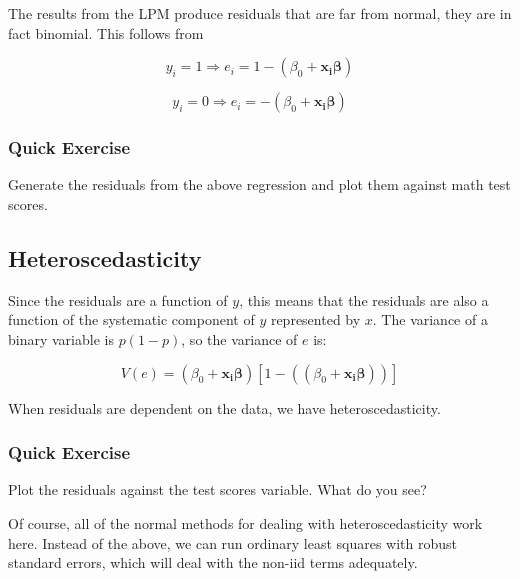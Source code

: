 \documentclass[12pt]{article}
\begin{document}
The results from the LPM produce residuals that are far from normal,
they are in fact binomial. This follows from

\begin{equation*}
  y_i=1 \Rightarrow e_i=1-(\beta_0 + \mathbf{x_i\beta})
\end{equation*}

\begin{equation*}
  y_i=0 \Rightarrow e_i=-(\beta_0 + \mathbf{x_i\beta})
\end{equation*}

\subsubsection{Quick Exercise}

Generate the residuals from the above regression and plot them against
math test scores. 

\subsection{Heteroscedasticity}

Since the residuals are a function of $y$, this means that the residuals
are also a function of the systematic component of $y$ represented by
$x$. The variance of a binary variable is $p(1-p)$, so the variance of
$e$ is:

\begin{equation}
  V(e)=(\beta_0 + \mathbf{x_i\beta})[1-((\beta_0 + \mathbf{x_i\beta}))]
\end{equation}

When residuals are dependent on the data, we have heteroscedasticity. 


\subsubsection{Quick Exercise}

Plot the residuals against the test scores variable. What do you see? 

Of course, all of the normal methods for dealing with
heteroscedasticity work here. Instead of the above, we can run
ordinary least squares with robust standard errors, which will deal
with the non-iid terms adequately. 
\end{document}
